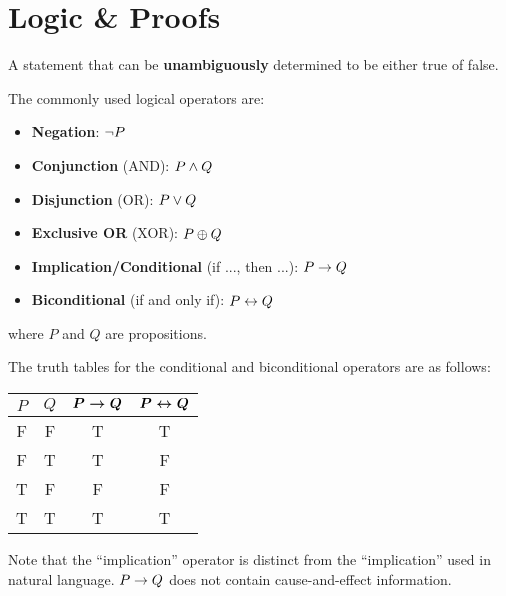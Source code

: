 \section{Logic \& Proofs}

\begin{definition}[Proposition]
    A statement that can be \textbf{unambiguously} determined to be either true of false.
\end{definition}

\begin{definition}
    The commonly used logical operators are:
    \begin{itemize}
        \item \textbf{Negation}: $\neg P$
        \item \textbf{Conjunction} (AND): $P \wedge Q$
        \item \textbf{Disjunction} (OR): $P \vee Q$
        \item \textbf{Exclusive OR} (XOR): $P \oplus Q$
        \item \textbf{Implication/Conditional} (if ..., then ...): $P \rightarrow Q$
        \item \textbf{Biconditional} (if and only if): $P \leftrightarrow Q$
    \end{itemize}
    where $P$ and $Q$ are propositions.
\end{definition}

\begin{remark}
    The truth tables for the conditional and biconditional operators are as follows:
    \begin{table}[H]
        \centering
        \begin{tabular}{cccc}
            $P$ & $Q$ & $\boldsymbol{P \rightarrow Q}$ & $\boldsymbol{P \leftrightarrow Q}$ \\ \hline
            F   & F   & T                     & T                     \\
            F   & T   & T                     & F                     \\
            T   & F   & F                     & F                     \\
            T   & T   & T                     & T                     \\
        \end{tabular}
    \end{table}

    Note that the ``implication'' operator is distinct from the ``implication'' used in natural
    language. $P \rightarrow Q$ does not contain cause-and-effect information.
\end{remark}

